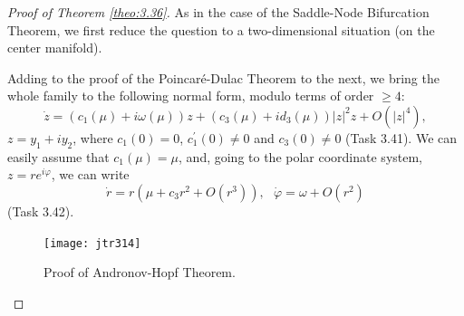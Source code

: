 \begin{proof}[Proof of Theorem \ref{theo:3.36}]
	As in the case of the Saddle-Node Bifurcation Theorem, we first reduce the question to a two-dimensional situation (on the center manifold).
	
	Adding to the proof of the Poincaré-Dulac Theorem to the next, we bring the whole family to the following normal form, modulo terms of order $\geq 4$:
	\begin{equation}
	\label{3.11}
	\dot{z}=\left( c_{1}(\mu )+i\omega (\mu )\right) z+(c_{3}(\mu )+id_{3}(\mu
	))\left\vert z\right\vert ^{2}z+O(\left\vert z\right\vert ^{4}),
	\end{equation}
	$z=y_{1}+iy_{2}$, where $c_{1}(0)=0$, $c_{1}^{\prime }(0)\not=0$ and $%
	c_{3}(0)\not=0$ (Task 3.41). We can easily assume that $c_{1}(\mu )=\mu $, and, going to the polar coordinate system, $z=re^{i\varphi }$, we can write
	\begin{equation}
	\label{3.12}
	\dot{r}=r\left( \mu +c_{3}r^{2}+O(r^{3})\right) ,\text{ \ \ }\dot{\varphi}%
	=\omega +O(r^{2})
	\end{equation}
	(Task 3.42).
	
	\begin{figure}[!ht]
		\centering
		\texttt{[image: jtr314]}
		\caption{Proof of Andronov-Hopf Theorem.}
		\label{fig:3.14}
	\end{figure}


\end{proof}
